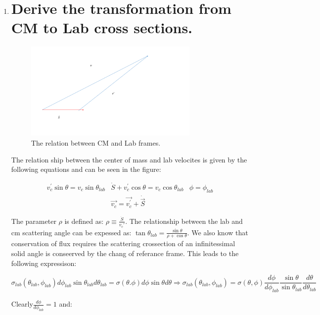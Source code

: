 \documentclass[fleqn, 12pt]{article}
\begin{document}
\begin{enumerate}

\item \part*{Derive the transformation from CM to Lab cross sections.}

\begin{figure}
\includegraphics[width=0.8\textwidth]{hw3-comlab.pdf}\protect\caption{The relation between CM and Lab frames.}
\end{figure}


The relation ship between the center of mass and lab velocites is
given by the following equations and can be seen in the figure:

\begin{eqnarray*}
v{}_{c}^{\prime}\sin\theta=v_{c}\sin\theta_{lab} & \dot{S}+v_{c}^{\prime}\cos\theta=v_{c}\cos\theta_{lab} & \phi=\phi_{lab}\\
 & \vec{v_{c}}=\vec{v_{c}^{\prime}}+\dot{\vec{S}}
\end{eqnarray*}


The parameter $\rho$ is defined as: $\rho\equiv\frac{\dot{S}}{v_{c}'}$.
The relationship between the lab and cm scattering angle can be expessed
as: $\tan\theta_{lab}=\frac{\sin\theta}{\rho+\cos\theta}$. We also
know that conservation of flux requires the scattering crossection
of an infinitessimal solid angle is conseerved by the chang of referance
frame. This leads to the following expressison:

\[
\sigma_{lab}(\theta_{lab},\phi_{lab})d\phi_{lab}\sin\theta_{lab}d\theta_{lab}=\sigma(\theta.\phi)d\phi\sin\theta d\theta\Rightarrow\sigma_{lab}(\theta_{lab},\phi_{lab})=\sigma(\theta,\phi)\frac{d\phi}{d\phi_{lab}}\frac{\sin\theta}{\sin\theta_{lab}}\frac{d\theta}{d\theta_{lab}}
\]


Clearly$\frac{d\phi}{d\phi_{lab}}=1$ and:


\end{enumerate}
\end{document}
